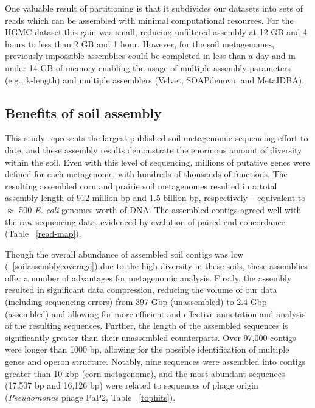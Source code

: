 \documentclass{pnastwo}
\begin{document}
\begin{article}
One valuable result of partitioning is that it subdivides our datasets into sets
of reads which can be assembled with minimal computational resources. For the
HGMC dataset,this gain was small, reducing unfiltered assembly at 12 GB and 4
hours to less than 2 GB and 1 hour. However, for the soil metagenomes,
previously impossible assemblies could be completed in less than a day and in
under 14 GB of memory enabling the usage of multiple assembly parameters (e.g.,
k-length) and multiple assemblers (Velvet, SOAPdenovo, and MetaIDBA).

\subsection{Benefits of soil assembly} 
This study represents the largest
published soil metagenomic sequencing effort to date, and these assembly results
demonstrate the enormous amount of diversity within the soil. Even with this
level of sequencing, millions of putative genes were defined for each
metagenome, with hundreds of thousands of functions. The resulting assembled
corn and prairie soil metagenomes resulted in a total assembly length of 912
million bp and 1.5 billion bp, respectively -- equivalent to $\approx$ 500
\emph{E. coli} genomes worth of DNA. The assembled contigs agreed well with the
raw sequencing data, evidenced by evalution of paired-end concordance (Table
~\ref{read-map}).

Though the overall abundance of assembled soil contigs was low (~\ref{soilassemblycoverage}) due to 
the high diversity in these soils, these assemblies offer a number of advantages for metagenomic
analysis. Firstly, the assembly resulted in significant data compression,
reducing the volume of our data (including sequencing errors) from 397 Gbp (unassembled)
to 2.4 Gbp (assembled) and allowing for more efficient and effective annotation
and analysis of the resulting sequences. Further, the length of the assembled sequences
is significantly greater than their unassembled counterparts.  
Over 97,000 contigs were longer than 1000 
bp, allowing for the possible identification of multiple genes and operon structure.
Notably, nine sequences were assembled into contigs greater than 10 kbp (corn
metagenome), and the most abundant sequences (17,507 bp and 16,126 bp) were
related to sequences of phage origin ({\em Pseudomonas} phage PaP2, Table ~\ref{tophits}).


\end{article}
\end{document}
